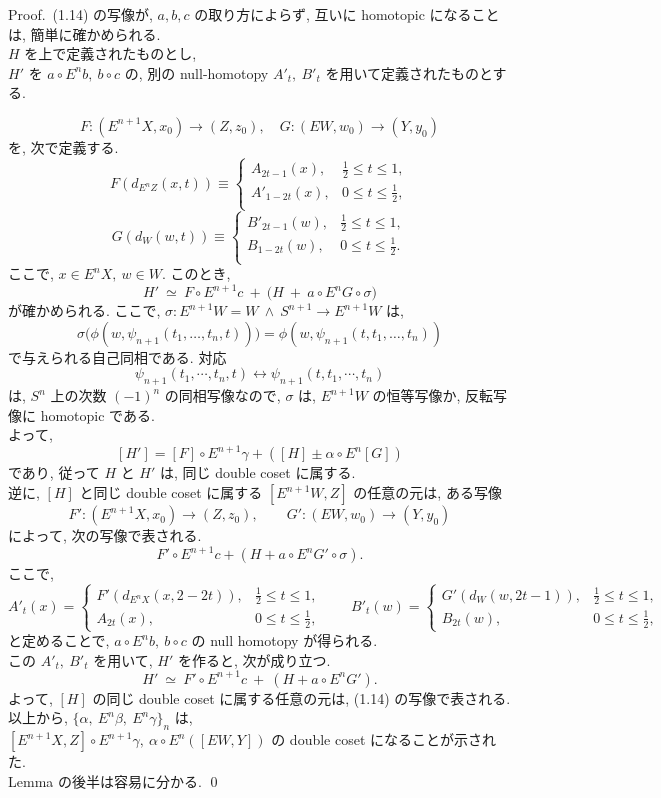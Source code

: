 \documentclass[12pt, leqno]{ltjsarticle}
\newcommand{\Ex}{E}        %
\numberwithin{equation}{section}
\theoremstyle{plain}
\theoremstyle{definition}
\theoremstyle{remark}
\begin{document}
Proof.\
(1.14) の写像が,
\(a,b,c\) の取り方によらず, 互いに homotopic になることは, 
簡単に確かめられる.\\
$H$ を上で定義されたものとし, \\
\(H'\) を
\(a\circ E^n b,\ b\circ c\) の, 
別の null-homotopy $A'_t,\ B'_t$ を用いて定義されたものとする.
\newpage

\[
F:(\Ex^{n+1}X,x_0)\to (Z,z_0), \quad
G:(\Ex W,w_0)\to (Y,y_0)
\]
を, 次で定義する.
\[
F(d_{E^{n}Z}(x,t))\equiv\left\{
\begin{array}{ll}
A_{2t-1}(x), & \frac{1}{2} \leq t \leq 1, \\
A'_{1-2t}(x), & 0 \leq t \leq \frac{1}{2}, \\
\end{array}\right.
\]
\[
G(d_{W}(w,t))\equiv\left\{
\begin{array}{ll}
B'_{2t-1}(w), & \frac{1}{2} \leq t \leq 1, \\
B_{1-2t}(w), & 0 \leq t \leq \frac{1}{2}. \\
\end{array}\right.
\]
ここで,
\(x\in E^n X,\ w\in W\).
このとき,
\[
H'\ \simeq\ F\circ \Ex^{n+1}c\ +\ \bigl(H\ +\ a\circ \Ex^n G\circ \sigma\bigr)
\]
が確かめられる. 
ここで, 
$\sigma:\Ex^{n+1}W=W\ \wedge\ S^{n+1}\to \Ex^{n+1}W$ は,
\[
\sigma\bigl(\phi(w,\psi_{n+1}(t_1,\ldots,t_n,t))\bigr)=\phi(w, \psi_{n+1}(t, t_1,\ldots,t_n))
\]
で与えられる自己同相である. 対応
\[
\psi_{n+1}(t_1,\cdots,t_n, t) \longleftrightarrow
\psi_{n+1}(t,t_1,\cdots,t_n)
\]
は, $S^{n}$ 上の次数 $(-1)^n$ の同相写像なので,
\(\sigma\) は,
\(E^{n+1}W\) の恒等写像か,
反転写像に homotopic である.\\
よって,
\[
[H'] = [F]\circ E^{n+1}\gamma + 
([H] \pm \alpha \circ E^n [G])
\]
であり,
従って $H$ と $H'$ は, 
同じ double coset に属する. \\
逆に, \([H]\) と同じ double coset に属する \([E^{n+1}W,Z]\) の任意の元は,
ある写像
\[
F':(E^{n+1}X,x_0)\to(Z,z_0),\qquad
G':(EW, w_0)\to (Y,y_0)
\]
によって, 次の写像で表される.
\[
F'\circ E^{n+1}c + (H + a\circ E^n G'\circ \sigma).
\]
ここで,
\[
A'_t(x)=
\begin{cases}
F'(d_{E^n X}(x,2-2t)),& \tfrac12\le t\le 1,\\
A_{2t}(x),& 0\le t\le \tfrac12,
\end{cases}
\qquad
B'_t(w)=
\begin{cases}
G'(d_W(w,2t-1)),& \tfrac12\le t\le 1,\\
B_{2t}(w),& 0\le t\le \tfrac12,
\end{cases}
\]
と定めることで,
\(a\circ E^n b,\ b\circ c\) の null homotopy が得られる.\\
この \(A'_t,\ B'_t\) を用いて, $H'$ を作ると,
次が成り立つ.
\[
H'\ \simeq\ F'\circ \Ex^{n+1}c\ +\ (H+a\circ \Ex^n G').
\]
よって,
\([H]\)
の同じ double coset に属する任意の元は,
(1.14) の写像で表される.\\
以上から,
\(
\{\alpha,\ \Ex^n\beta,\ \Ex^n\gamma\}_n
\)
は,\\
\([E^{n+1}X,Z]\circ E^{n+1}\gamma,\ \alpha\circ E^n([EW,Y])\)
の double coset になることが示された. \\
Lemma の後半は容易に分かる.
\qed
\end{document}
